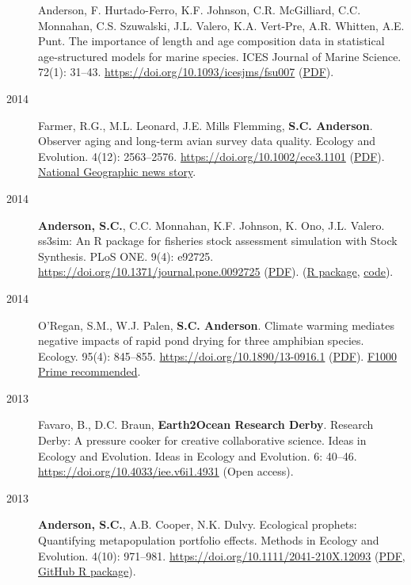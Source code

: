 \begin{description}
{Anderson}, F. Hurtado-Ferro, K.F. Johnson, C.R. McGilliard, C.C.
Monnahan, C.S. Szuwalski, J.L. Valero, K.A. Vert-Pre, A.R. Whitten, A.E.
Punt. The importance of length and age composition data in statistical
age-structured models for marine species. ICES Journal of Marine
Science. 72(1): 31--43. \url{https://doi.org/10.1093/icesjms/fsu007}
(\href{http://icesjms.oxfordjournals.org/content/early/2014/02/20/icesjms.fsu007.full.pdf}{PDF}).
\item[2014]
Farmer, R.G., M.L. Leonard, J.E. Mills Flemming, \textbf{S.C. Anderson}.
Observer aging and long-term avian survey data quality. Ecology and
Evolution. 4(12): 2563--2576. \url{https://doi.org/10.1002/ece3.1101}
(\href{http://onlinelibrary.wiley.com/doi/10.1002/ece3.1101/pdf}{PDF}).
\href{http://news.nationalgeographic.com/news/2014/08/140805-aging-birders-breeding-bird-survey-volunteers-science/}{National
Geographic news story}.
\item[2014]
\textbf{Anderson, S.C.}, C.C. Monnahan, K.F. Johnson, K. Ono, J.L.
Valero. ss3sim: An R package for fisheries stock assessment simulation
with Stock Synthesis. PLoS ONE. 9(4): e92725.
\url{https://doi.org/10.1371/journal.pone.0092725}
(\href{http://www.plosone.org/article/fetchObject.action?uri=info\%3Adoi\%2F10.1371\%2Fjournal.pone.0092725&representation=PDF}{PDF}).
(\href{http://cran.r-project.org/web/packages/ss3sim/index.html}{R
package}, \href{https://github.com/ss3sim/ss3sim}{code}).
\item[2014]
O'Regan, S.M., W.J. Palen, \textbf{S.C. Anderson}. Climate warming
mediates negative impacts of rapid pond drying for three amphibian
species. Ecology. 95(4): 845--855.
\url{https://doi.org/10.1890/13-0916.1}
(\href{http://onlinelibrary.wiley.com/doi/10.1890/13-0916.1/epdf}{PDF}).
\href{https://facultyopinions.com/prime/718498042}{F1000 Prime
recommended}.
\item[2013]
Favaro, B., D.C. Braun, \textbf{Earth2Ocean Research Derby}. Research
Derby: A pressure cooker for creative collaborative science. Ideas in
Ecology and Evolution. Ideas in Ecology and Evolution. 6: 40--46.
\url{https://doi.org/10.4033/iee.v6i1.4931} (Open access).
\item[2013]
\textbf{Anderson, S.C.}, A.B. Cooper, N.K. Dulvy. Ecological prophets:
Quantifying metapopulation portfolio effects. Methods in Ecology and
Evolution. 4(10): 971--981.
\url{https://doi.org/10.1111/2041-210X.12093}
(\href{https://www.dropbox.com/s/7tx1h1pkmmp222j/Anderson_etal_2013_ecological_prophets_with_SOM.pdf?dl=1}{PDF},
\href{https://github.com/seananderson/ecofolio}{GitHub R package}).

\end{description}
